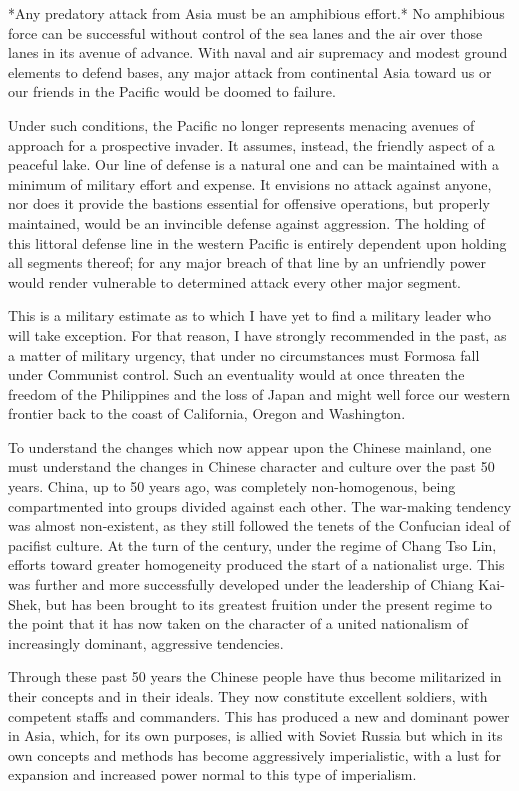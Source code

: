 \documentclass[a4paper]{amsbook}
\begin{document}
*Any predatory attack from Asia must be an amphibious effort.* No amphibious force can be successful without control of the sea lanes and the air over those lanes in its avenue of advance. With naval and air supremacy and modest ground elements to defend bases, any major attack from continental Asia toward us or our friends in the Pacific would be doomed to failure.

Under such conditions, the Pacific no longer represents menacing avenues of approach for a prospective invader. It assumes, instead, the friendly aspect of a peaceful lake. Our line of defense is a natural one and can be maintained with a minimum of military effort and expense. It envisions no attack against anyone, nor does it provide the bastions essential for offensive operations, but properly maintained, would be an invincible defense against aggression. The holding of this littoral defense line in the western Pacific is entirely dependent upon holding all segments thereof; for any major breach of that line by an unfriendly power would render vulnerable to determined attack every other major segment.

This is a military estimate as to which I have yet to find a military leader who will take exception. For that reason, I have strongly recommended in the past, as a matter of military urgency, that under no circumstances must Formosa fall under Communist control. Such an eventuality would at once threaten the freedom of the Philippines and the loss of Japan and might well force our western frontier back to the coast of California, Oregon and Washington.

To understand the changes which now appear upon the Chinese mainland, one must understand the changes in Chinese character and culture over the past 50 years. China, up to 50 years ago, was completely non-homogenous, being compartmented into groups divided against each other. The war-making tendency was almost non-existent, as they still followed the tenets of the Confucian ideal of pacifist culture. At the turn of the century, under the regime of Chang Tso Lin, efforts toward greater homogeneity produced the start of a nationalist urge. This was further and more successfully developed under the leadership of Chiang Kai-Shek, but has been brought to its greatest fruition under the present regime to the point that it has now taken on the character of a united nationalism of increasingly dominant, aggressive tendencies.

Through these past 50 years the Chinese people have thus become militarized in their concepts and in their ideals. They now constitute excellent soldiers, with competent staffs and commanders. This has produced a new and dominant power in Asia, which, for its own purposes, is allied with Soviet Russia but which in its own concepts and methods has become aggressively imperialistic, with a lust for expansion and increased power normal to this type of imperialism.
\end{document}
